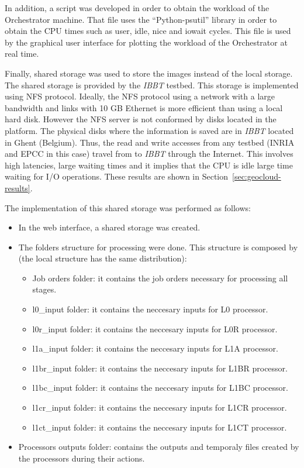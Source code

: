 In addition, a script was developed in order to obtain the workload of the
Orchestrator machine. That file uses the ``Python-psutil'' library in order to
obtain the CPU times such as user, idle, nice and iowait cycles. This file is
used by the graphical user interface for plotting the workload of the Orchestrator at
real time.

Finally,  shared storage was used to store the images instead of
the local storage. The shared storage is provided by the \emph{IBBT} testbed. This storage is implemented using \ac{NFS} protocol. Ideally, the \ac{NFS}
protocol using a network with a large bandwidth and links with 10 GB Ethernet is
more efficient than using a local hard disk. However the \ac{NFS}
server is not conformed by disks located in the \bonfire platform. The physical disks
where the information is saved are in \emph{IBBT} located in Ghent (Belgium). Thus, the
read and write accesses from any \bonfire testbed (INRIA and EPCC in this case)
travel from \bonfire to \emph{IBBT} through the Internet. This involves high
latencies, large waiting times and it implies that the CPU is idle large time
waiting for I/O operations. These results are shown in Section~\ref{sec:geocloud-results}.

The implementation of this shared storage was performed as follows:
\begin{itemize}
\item In the \bonfire web interface, a shared storage was created. 
\item The folders structure for processing were done. This structure is composed
  by (the local structure has the same distribution): 
\begin{itemize}
\item Job orders folder: it contains the job orders necessary for processing all
  stages.
\item l0\_input folder: it contains the neccesary inputs for L0 processor. 
\item l0r\_input folder: it contains the neccesary inputs for L0R processor. 
\item l1a\_input folder: it contains the neccesary inputs for L1A processor. 
\item l1br\_input folder: it contains the neccesary inputs for L1BR processor. 
\item l1bc\_input folder: it contains the neccesary inputs for L1BC processor. 
\item l1cr\_input folder: it contains the neccesary inputs for L1CR processor. 
\item l1ct\_input folder: it contains the neccesary inputs for L1CT processor. 
\end{itemize}
\item Processors outputs folder: contains the outputs and temporaly files
  created by the processors during their actions.
\end{itemize}

